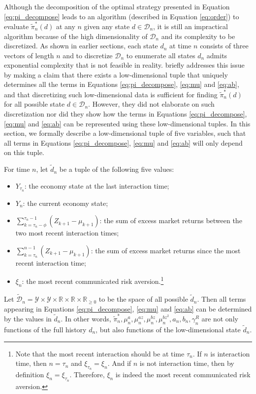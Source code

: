 Although the decomposition of the optimal strategy presented in Equation \eqref{eq:pi_decompose} leads to an algorithm (described in Equation \eqref{eq:order}) to evaluate $\tilde\pi_n^*(d)$ at any $n$ given any state $d\in\mathcal D_n$, it is still an impractical algorithm because of the high dimensionality of $\mathcal D_n$ and its complexity to be discretized. As shown in earlier sections, each state $d_n$ at time $n$ consists of three vectors of length $n$ and to discretize $\mathcal D_n$ to enumerate all states $d_n$ admits exponential complexity that is not feasible in reality.  briefly addresses this issue by making a claim that there exists a low-dimensional tuple that uniquely determines all the terms in Equations \eqref{eq:pi_decompose}, \eqref{eq:mu} and \eqref{eq:ab}, and that discretizing such low-dimensional data is sufficient for finding $\tilde\pi_n^*(d)$ for all possible state $d\in\mathcal{D}_n$. However, they did not elaborate on such discretization nor did they show how the terms in Equations \eqref{eq:pi_decompose}, \eqref{eq:mu} and \eqref{eq:ab} can be represented using these low-dimensional tuples. In this section, we formally describe a low-dimensional tuple of five variables, such that all terms in Equations \eqref{eq:pi_decompose}, \eqref{eq:mu} and \eqref{eq:ab} will only depend on this tuple.

\begin{theorem}\label{thm:disc}
    For time $n$, let $\tilde d_n$ be a tuple of the following five values:\begin{itemize}
        \item $Y_{\tau_n}$: the economy state at the last interaction time;
        \item $Y_n$: the current economy state;
        \item $\sum_{k=\tau_n-\phi}^{\tau_n-1}(Z_{k+1}-\mu_{k+1})$: the sum of excess market returns between the two most recent interaction times;
        \item $\sum_{k=\tau_n}^{n-1}(Z_{k+1}-\mu_{k+1})$: the sum of excess market returns since the most recent interaction time;
        \item $\xi_n$: the most recent communicated risk aversion.\footnote{Note that the most recent interaction should be at time $\tau_n$. If $n$ is interaction time, then $n=\tau_n$ and $\xi_{\tau_n}=\xi_n$. And if $n$ is not interaction time, then by definition $\xi_n=\xi_{\tau_n}$. Therefore, $\xi_n$ is indeed the most recent communicated risk aversion.}
    \end{itemize}
    Let $\tilde{\mathcal D}_n=\mathcal Y\times\mathcal Y\times\mathbb{R}\times\mathbb{R}\times\mathbb{R}_{\geq0}$ to be the space of all possible $\tilde d_n$. Then all terms appearing in Equations \eqref{eq:pi_decompose}, \eqref{eq:mu} and \eqref{eq:ab} can be determined by the values in $\tilde d_n$. In other words, $\tilde\pi_n^*,\mu_n^a,\mu_n^{az},\mu_n^{bz},\mu_n^{bz^2},a_n,b_n,\gamma_n^R$ are not only functions of the full history $d_n$, but also functions of the low-dimensional state $\tilde d_n$.
\end{theorem}

